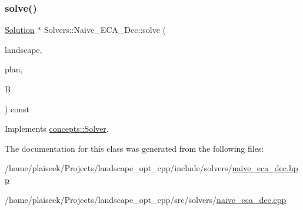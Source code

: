 \subsubsection{\texorpdfstring{solve()}{solve()}}
{\footnotesize\ttfamily \hyperlink{class_solution}{Solution} $\ast$ Solvers\+::\+Naive\+\_\+\+E\+C\+A\+\_\+\+Dec\+::solve (\begin{DoxyParamCaption}\item[{const \hyperlink{class_landscape}{Landscape} \&}]{landscape,  }\item[{const \hyperlink{class_restoration_plan}{Restoration\+Plan} \&}]{plan,  }\item[{const double}]{B }\end{DoxyParamCaption}) const\hspace{0.3cm}{\ttfamily [virtual]}}



Implements \hyperlink{classconcepts_1_1_solver_af323ad29df1e7b87facd7dc007568c80}{concepts\+::\+Solver}.



The documentation for this class was generated from the following files\+:\begin{DoxyCompactItemize}
\item 
/home/plaiseek/\+Projects/landscape\+\_\+opt\+\_\+cpp/include/solvers/\hyperlink{naive__eca__dec_8hpp}{naive\+\_\+eca\+\_\+dec.\+hpp}\item 
/home/plaiseek/\+Projects/landscape\+\_\+opt\+\_\+cpp/src/solvers/\hyperlink{naive__eca__dec_8cpp}{naive\+\_\+eca\+\_\+dec.\+cpp}\end{DoxyCompactItemize}
